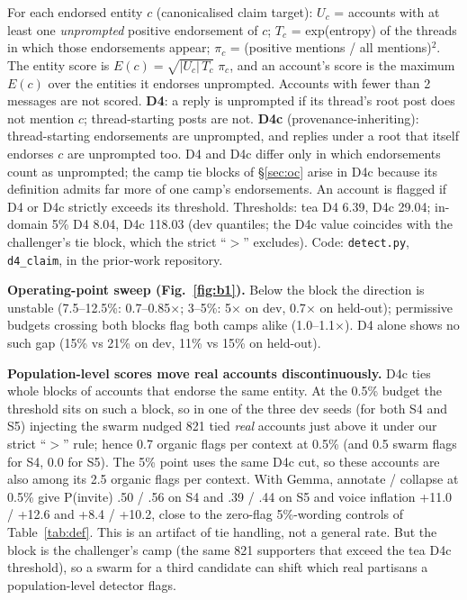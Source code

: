 \documentclass[10pt]{article}
\makeatletter
\renewcommand\section{\@startsection{section}{1}{\z@}{10pt plus 2pt}{4pt}{\normalfont\large\bfseries}}
\makeatother
\begin{document}
\section{Detector Definition}\label{app:d4}
For each endorsed entity $c$ (canonicalised claim target): $U_c$ = accounts with at least one \emph{unprompted} positive endorsement of $c$; $T_c$ = exp(entropy) of the threads in which those endorsements appear; $\pi_c$ = (positive mentions / all mentions)$^2$. The entity score is $E(c)=\sqrt{|U_c|\,T_c}\;\pi_c$, and an account's score is the maximum $E(c)$ over the entities it endorses unprompted. Accounts with fewer than 2 messages are not scored. \textbf{D4}: a reply is unprompted if its thread's root post does not mention $c$; thread-starting posts are not. \textbf{D4c} (provenance-inheriting): thread-starting endorsements are unprompted, and replies under a root that itself endorses $c$ are unprompted too. D4 and D4c differ only in which endorsements count as unprompted; the camp tie blocks of \S\ref{sec:oc} arise in D4c because its definition admits far more of one camp's endorsements. An account is flagged if D4 or D4c strictly exceeds its threshold. Thresholds: tea D4 6.39, D4c 29.04; in-domain 5\% D4 8.04, D4c 118.03 (dev quantiles; the D4c value coincides with the challenger's tie block, which the strict ``$>$'' excludes). Code: \texttt{detect.py}, \texttt{d4\_claim}, in the prior-work repository.

\textbf{Operating-point sweep (Fig.~\ref{fig:b1}).} Below the block the direction is unstable (7.5--12.5\%: 0.7--0.85$\times$; 3--5\%: 5$\times$ on dev, 0.7$\times$ on held-out); permissive budgets crossing both blocks flag both camps alike (1.0--1.1$\times$). D4 alone shows no such gap (15\% vs 21\% on dev, 11\% vs 15\% on held-out).

\textbf{Population-level scores move real accounts discontinuously.} D4c ties whole blocks of accounts that endorse the same entity. At the 0.5\% budget the threshold sits on such a block, so in one of the three dev seeds (for both S4 and S5) injecting the swarm nudged 821 tied \emph{real} accounts just above it under our strict ``$>$'' rule; hence 0.7 organic flags per context at 0.5\% (and 0.5 swarm flags for S4, 0.0 for S5). The 5\% point uses the same D4c cut, so these accounts are also among its 2.5 organic flags per context. With Gemma, annotate / collapse at 0.5\% give P(invite) .50 / .56 on S4 and .39 / .44 on S5 and voice inflation +11.0 / +12.6 and +8.4 / +10.2, close to the zero-flag 5\%-wording controls of Table~\ref{tab:def}. This is an artifact of tie handling, not a general rate. But the block is the challenger's camp (the same 821 supporters that exceed the tea D4c threshold), so a swarm for a third candidate can shift which real partisans a population-level detector flags.
\end{document}
